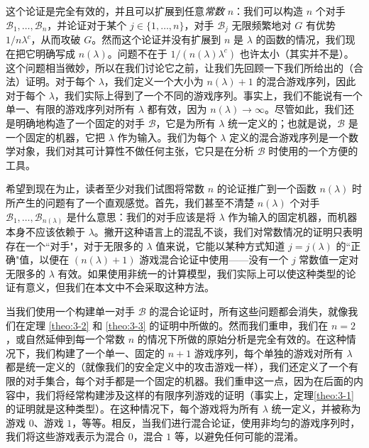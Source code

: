 这个论证是完全有效的，并且可以扩展到任意\emph{常数} $n$：我们可以构造 $n$ 个对手 $\mathcal{B}_1,\dots,\mathcal{B}_n$，并论证对于某个 $j\in\{1,\dots,n\}$，对手 $\mathcal{B}_j$ 无限频繁地对 $G$ 有优势 ${1}/{n\lambda^c}$，从而攻破 $G$。然而这个论证并没有扩展到 $n$ 是 $\lambda$ 的函数的情况，我们现在把它明确写成 $n(\lambda)$。问题不在于 ${1}/({n(\lambda)\lambda^c})$ 也许太小（其实并不是）。这个问题相当微妙，所以在我们讨论它之前，让我们先回顾一下我们所给出的（合法）证明。对于每个 $\lambda$，我们定义一个大小为 $n(\lambda)+1$ 的混合游戏序列，因此对于每个 $\lambda$，我们实际上得到了一个不同的游戏序列。事实上，我们不能说有一个单一、有限的游戏序列对所有 $\lambda$ 都有效，因为 $n(\lambda)\to\infty$。尽管如此，我们还是明确地构造了一个固定的对手 $\mathcal B$，它是为所有 $\lambda$ 统一定义的；也就是说，$\mathcal B$ 是一个固定的机器，它把 $\lambda$ 作为输入。我们为每个 $\lambda$ 定义的混合游戏序列是一个数学对象，我们对其可计算性不做任何主张，它只是在分析 $\mathcal B$ 时使用的一个方便的工具。

希望到现在为止，读者至少对我们试图将常数 $n$ 的论证推广到一个函数 $n(\lambda)$ 时所产生的问题有了一个直观感觉。首先，我们甚至不清楚 $n(\lambda)$ 个对手 $\mathcal{B}_1,\dots,\mathcal{B}_{n(\lambda)}$ 是什么意思：我们的对手应该是将 $\lambda$ 作为输入的固定机器，而机器本身不应该依赖于 $\lambda$。撇开这种语言上的混乱不谈，我们对常数情况的证明只表明存在一个``对手"，对于无限多的 $\lambda$ 值来说，它能以某种方式知道 $j=j(\lambda)$ 的``正确"值，以便在 $(n(\lambda)+1)$ 游戏混合论证中使用——没有一个 $j$ 常数值一定对无限多的 $\lambda$ 有效。如果使用非统一的计算模型，我们实际上可以使这种类型的论证有意义，但我们在本文中不会采取这种方法。

当我们使用一个构建单一对手 $\mathcal B$ 的混合论证时，所有这些问题都会消失，就像我们在定理 \ref{theo:3-2} 和 \ref{theo:3-3} 的证明中所做的。然而我们重申，我们在 $n=2$，或自然延伸到每一个常数 $n$ 的情况下所做的原始分析是完全有效的。在这种情况下，我们构建了一个单一、固定的 $n+1$ 游戏序列，每个单独的游戏对所有 $\lambda$ 都是统一定义的（就像我们的安全定义中的攻击游戏一样），我们还定义了一个有限的对手集合，每个对手都是一个固定的机器。我们重申这一点，因为在后面的内容中，我们将经常构建涉及这样的有限序列游戏的证明（事实上，定理\ref{theo:3-1}的证明就是这种类型）。在这种情况下，每个游戏将为所有 $\lambda$ 统一定义，并被称为游戏 $0$、游戏 $1$，等等。相反，当我们进行混合论证，使用非均匀的游戏序列时，我们将这些游戏表示为混合 $0$，混合 $1$ 等，以避免任何可能的混淆。
